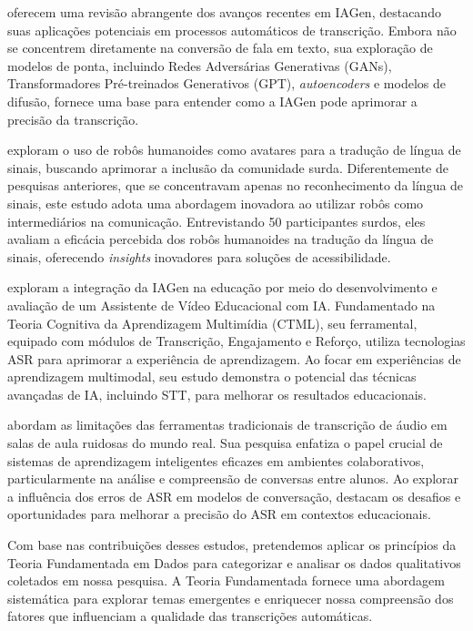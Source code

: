  oferecem uma revisão abrangente dos avanços recentes em IAGen, destacando suas aplicações potenciais em processos automáticos de transcrição. Embora não se concentrem diretamente na conversão de fala em texto, sua exploração de modelos de ponta, incluindo Redes Adversárias Generativas (GANs), Transformadores Pré-treinados Generativos (GPT), \textit{autoencoders} e modelos de difusão, fornece uma base para entender como a IAGen pode aprimorar a precisão da transcrição.

 exploram o uso de robôs humanoides como avatares para a tradução de língua de sinais, buscando aprimorar a inclusão da comunidade surda. Diferentemente de pesquisas anteriores, que se concentravam apenas no reconhecimento da língua de sinais, este estudo adota uma abordagem inovadora ao utilizar robôs como intermediários na comunicação. Entrevistando 50 participantes surdos, eles avaliam a eficácia percebida dos robôs humanoides na tradução da língua de sinais, oferecendo \textit{insights} inovadores para soluções de acessibilidade.

 exploram a integração da IAGen na educação por meio do desenvolvimento e avaliação de um Assistente de Vídeo Educacional com IA. Fundamentado na Teoria Cognitiva da Aprendizagem Multimídia (CTML), seu ferramental, equipado com módulos de Transcrição, Engajamento e Reforço, utiliza tecnologias ASR para aprimorar a experiência de aprendizagem. Ao focar em experiências de aprendizagem multimodal, seu estudo demonstra o potencial das técnicas avançadas de IA, incluindo STT, para melhorar os resultados educacionais.

 abordam as limitações das ferramentas tradicionais de transcrição de áudio em salas de aula ruidosas do mundo real. Sua pesquisa enfatiza o papel crucial de sistemas de aprendizagem inteligentes eficazes em ambientes colaborativos, particularmente na análise e compreensão de conversas entre alunos. Ao explorar a influência dos erros de ASR em modelos de conversação, destacam os desafios e oportunidades para melhorar a precisão do ASR em contextos educacionais.

Com base nas contribuições desses estudos, pretendemos aplicar os princípios da Teoria Fundamentada em Dados \cite{Charmaz2009} para categorizar e analisar os dados qualitativos coletados em nossa pesquisa. A Teoria Fundamentada fornece uma abordagem sistemática para explorar temas emergentes e enriquecer nossa compreensão dos fatores que influenciam a qualidade das transcrições automáticas.

